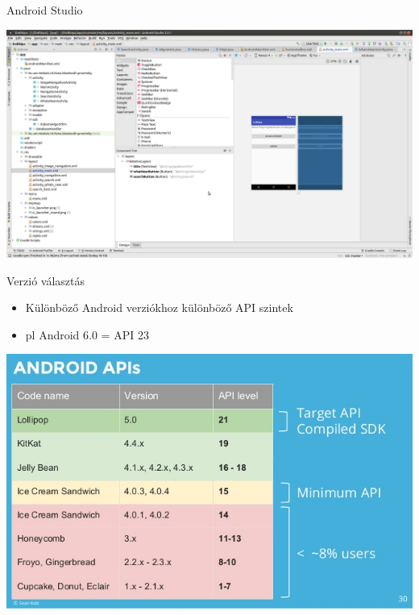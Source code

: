 \documentclass{beamer}
\begin{document}
\begin{frame}[fragile]{Android Studio}
	\begin{minipage}{0.9\textwidth}
		\begin{itemize}
			\includegraphics[width=1\linewidth]{figures/androidStudio.png}
		\end{itemize}
	\end{minipage}
\end{frame}
\begin{frame}[fragile]{Verzió választás}
	\begin{minipage}{0.29\textwidth}
		\begin{itemize}
			\item Különböző Android verziókhoz különböző API szintek
			\item pl Android 6.0 = API 23
		\end{itemize}
	\end{minipage}
	\begin{minipage}{0.70\textwidth}
		\begin{itemize}
			\includegraphics[width=1\linewidth]{figures/android-best-practices-2015-30-638.jpg}
		\end{itemize}
	\end{minipage}
\end{frame}
\end{document}

